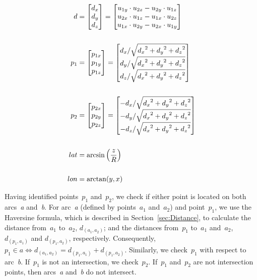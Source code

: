 \newcommand{\dvlength}{\sqrt{{d_x}^2 + {d_y}^2 + {d_z}^2}}

\begin{figure}[ht]
	\begin{align}
		\label{eq:direction_vector}
			d & =
			\begin{bmatrix}
				d_x\\
				d_y\\
				d_z
			\end{bmatrix} =
			\begin{bmatrix}
				u_{1y} \cdot u_{2z} - u_{2y} \cdot u_{1z}\\
				u_{2x} \cdot u_{1z} - u_{1x} \cdot u_{2z}\\
				u_{1x} \cdot u_{2y} - u_{2x} \cdot u_{1y}
			\end{bmatrix}\\
			\br
		\label{eq:unit_vector_b}
			p_1 & =
			\begin{bmatrix}
				p_{1x}\\
				p_{1y}\\
				p_{1z}
			\end{bmatrix} =
			\begin{bmatrix}
				d_x / \dvlength\\
				d_y / \dvlength\\
				d_z / \dvlength
			\end{bmatrix}\\
			\br
		\label{eq:inverted_unit_vector}
			p_2 & =
			\begin{bmatrix}
				p_{2x}\\
				p_{2y}\\
				p_{2z}
			\end{bmatrix} =
			\begin{bmatrix}
				-d_x / \dvlength\\
				-d_y / \dvlength\\
				-d_z / \dvlength
			\end{bmatrix}\\
			\br
		\label{eq:latitude}
			lat & = \arcsin \left(\frac{z}{R}\right)\\
			\br
		\label{eq:longitude}
			lon & = \arctan(y, x)
	\end{align}
\end{figure}

Having identified points~$p_1$ and~$p_2$, we check if either point is located on both arcs~\emph{a} and~\emph{b}. For arc~\emph{a} (defined by points~$a_1$ and~$a_2$) and point~$p_1$, we use the Haversine formula, which is described in Section~\ref{sec:Distance}, to calculate the distance from~$a_1$ to~$a_2$, $d_{(a_1, a_2)}$; and the distances from~$p_1$ to~$a_1$ and~$a_2$, $d_{(p_1, a_1)}$ and $d_{(p_1, a_2)}$, respectively. Consequently, $p_1 \in a \Leftrightarrow d_{(a_1, a_2)} = d_{(p_1, a_1)} + d_{(p_1, a_2)}$. Similarly, we check~$p_1$ with respect to arc~\emph{b}. If~$p_1$ is not an intersection, we check~$p_2$. If~$p_1$ and~$p_2$ are not intersection points, then arcs~\emph{a} and~\emph{b} do not intersect.

